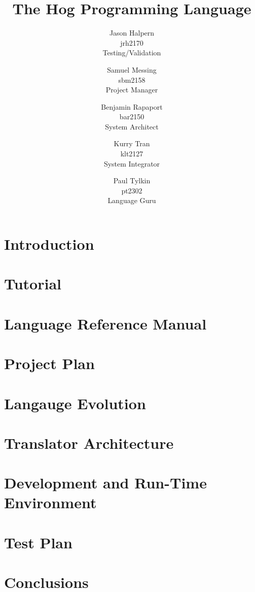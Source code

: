 \documentclass{book}
\title{\huge \textbf{The Hog Programming Language}}
\author{Jason Halpern \\ jrh2170 \\ Testing/Validation
        \and Samuel Messing \\ sbm2158 \\ Project Manager
        \and Benjamin Rapaport \\ bar2150 \\ System Architect
        \and Kurry Tran \\ klt2127 \\ System Integrator
        \and Paul Tylkin \\ pt2302 \\ Language Guru}
\begin{document}
\maketitle

\tableofcontents

\chapter{Introduction}
\label{chap:intro}

\chapter{Tutorial}
\label{chap:tutor}

\chapter{Language Reference Manual}
\label{chap:LRM}

\chapter{Project Plan}
\label{chap:plan}

\chapter{Langauge Evolution}
\label{chap:evo}

\chapter{Translator Architecture}
\label{chap:trans}

\chapter{Development and Run-Time Environment}
\label{chap:environ}

\chapter{Test Plan}
\label{chap:test}

\chapter{Conclusions}
\label{chap:concl}

\appendix
\end{document}
